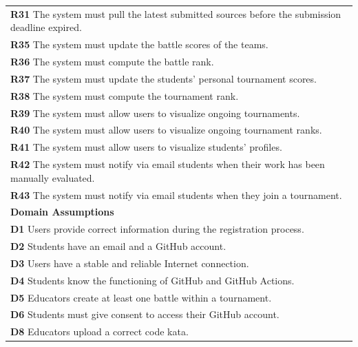 \begin{table}[H]
    \begin{tabularx}{\textwidth}{X}
        \textbf{R31} The system must pull the latest submitted sources before the submission deadline expired.     \\  
        \textbf{R35} The system must update the battle scores of the teams.       \\ 
        \textbf{R36} The system must compute the battle rank.     \\  
        \textbf{R37} The system must update the students' personal tournament scores.         \\ 
        \textbf{R38} The system must compute the tournament rank.         \\
        \textbf{R39} The system must allow users to visualize ongoing tournaments.    \\
        \textbf{R40} The system must allow users to visualize ongoing tournament ranks.       \\
        \textbf{R41} The system must allow users to visualize students' profiles.     \\
        \textbf{R42} The system must notify via email students when their work has been manually evaluated. \\
        \textbf{R43} The system must notify via email students when they join a tournament. \\
        \midrule
        \textbf{Domain Assumptions}                                                                                                  \\ \midrule
        \textbf{D1} Users provide correct information during the registration process. \\
        \textbf{D2} Students have an email and a GitHub account.     \\
        \textbf{D3} Users have a stable and reliable Internet connection. \\
        \textbf{D4} Students know the functioning of GitHub and GitHub Actions.      \\
        \textbf{D5} Educators create at least one battle within a tournament.        \\
        \textbf{D6} Students must give consent to access their GitHub account.       \\
        \textbf{D8} Educators upload a correct code kata.        \\
        \bottomrule
    \end{tabularx}
\end{table}

